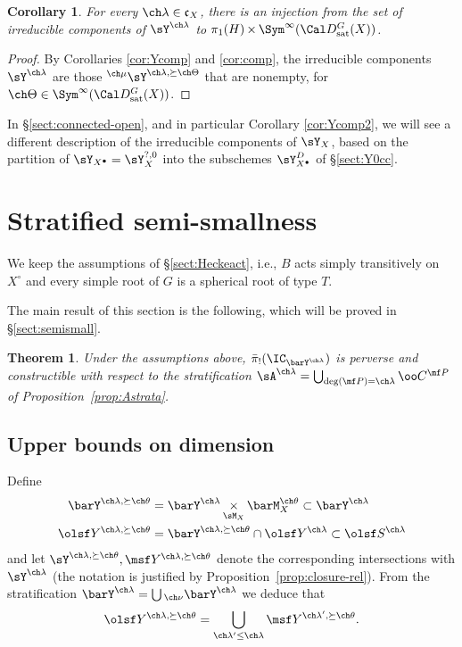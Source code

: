 \documentclass[final]{amsart}
\newtheorem{thm}[subsubsection]{Theorem}
\newtheorem{cor}[subsubsection]{Corollary}
\theoremstyle{remark}
\theoremstyle{definition}
\DeclareMathOperator*{\xt}{\times}
\numberwithin{equation}{section}
\begin{document}
\begin{cor}\label{cor:compY}
For every $\ch\lambda\in \mathfrak c_X$, there is an injection from the set of irreducible components of $\sY^{\ch\lambda}$ to $\pi_1(H) \xt \Sym^\infty(\Cal D^G_{\mathrm{sat}}(X))$.
\end{cor}

\begin{proof}
By Corollaries \ref{cor:Ycomp} and \ref{cor:comp}, the irreducible components $\sY^{\ch\lambda}$ are those $^{\ch\mu}\sY^{\ch\lambda,\succeq\ch\Theta}$ that are nonempty, for $\ch\Theta \in \Sym^\infty(\Cal D^G_{\mathrm{sat}}(X))$.
\end{proof}

In \S \ref{sect:connected-open}, and in particular Corollary \ref{cor:Ycomp2}, we will see a different description of the irreducible components of $\sY_X$, based on the partition of $\sY_{X^\bullet} = \sY_X^{?,0}$ into the subschemes $\sY^D_{X^\bullet}$ of \S \ref{sect:Y0cc}.




\section{Stratified semi-smallness}\label{sect:centralfiber}


We keep the assumptions of \S\ref{sect:Heckeact}, i.e.,  
$B$ acts simply transitively on $X^\circ$ and every simple root of $G$ is
a spherical root of type $T$.  



\smallskip

The main result of this section is the following, which 
will be proved in \S\ref{sect:semismall}. 

\begin{thm}  \label{thm:barpiperverse}
Under the assumptions above, 
$\bar\pi_!(\IC_{\barY^{\ch\lambda}})$ is perverse
and constructible with respect to the stratification 
$\sA^{\ch\lambda} = \bigcup_{\deg(\mf P)=\ch\lambda} \oo C^{\mf P}$
of Proposition~\ref{prop:Astrata}.
\end{thm}




\subsection{Upper bounds on dimension}

Define 
\begin{align*}
    \barY^{\ch\lambda,\succeq \ch\theta} &= \barY^{\ch\lambda} \xt_{\sM_X} \barM_X^{\ch\theta} \subset \barY^{\ch\lambda} \\
    \olsf Y^{\ch\lambda, \succeq \ch\theta} &= \barY^{\ch\lambda, \succeq\ch\theta} \cap \olsf Y^{\ch\lambda} \subset \olsf S^{\ch\lambda}
\end{align*} 
and let $\sY^{\ch\lambda,\succeq \ch\theta}, \msf Y^{\ch\lambda,\succeq \ch\theta}$ denote the corresponding intersections with $\sY^{\ch\lambda}$
(the notation is  
justified by Proposition~\ref{prop:closure-rel}). 
From the stratification $\barY^{\ch\lambda} = \bigcup {_{\ch\nu}}\barY^{\ch\lambda}$ we deduce that 
\[\olsf Y^{\ch\lambda,\succeq\ch\theta} = \bigcup_{\ch\lambda' \le \ch\lambda} \msf Y^{\ch\lambda',\succeq\ch\theta}.\]
\end{document}
